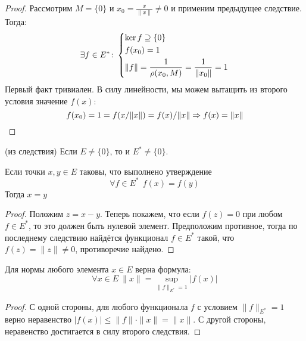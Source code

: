 \begin{proof}
	Рассмотрим $M = \{0\}$ и $x_0 = \frac{x}{\|x\|} \neq 0$ и применим предыдущее следствие. Тогда:
	\[
		\exists f \in E^* \colon \left\{ \begin{aligned} 
			&{\ker f \supseteq \{0\}}
			\\
			&{f(x_0) = 1}
			\\
			&{\|f\| = \frac{1}{\rho(x_0, M)} = \frac{1}{\|x_0\|} = 1}
		 \end{aligned} \right.
	\]
	Первый факт тривиален. В силу линейности, мы можем вытащить из второго условия значение $f(x)$:
	\[
		f(x_0) = 1 = f(x / \|x\|) = f(x) / \|x\| \Rightarrow f(x) = \|x\|
	\]
\end{proof}

\begin{corollary} (из следствия)
	Если $E \neq \{0\}$, то и $E^* \neq \{0\}$.
\end{corollary}

\begin{corollary}
	Если точки $x, y \in E$ таковы, что выполнено утверждение
	\[
		\forall f \in E^*\ \ f(x) = f(y)
	\]
	Тогда $x = y$
\end{corollary}

\begin{proof}
	Положим $z = x - y$. Теперь покажем, что если $f(z) = 0$ при любом $f \in E^*$, то это должен быть нулевой элемент. Предположим противное, тогда по последнему следствию найдётся функционал $f \in E^*$ такой, что $f(z) = \|z\| \neq 0$, противоречие найдено.
\end{proof}

\begin{corollary}
	Для нормы любого элемента $x \in E$ верна формула:
	\[
		\forall x \in E\ \|x\| = \sup_{\|f\|_{E^*} =  1} |f(x)|
	\]
\end{corollary}

\begin{proof}
	С одной стороны, для любого функционала $f$ с условием $\|f\|_{E^*} = 1$ верно неравенство $|f(x)| \le \|f\| \cdot \|x\| = \|x\|$. С другой стороны, неравенство достигается в силу второго следствия.
\end{proof}

